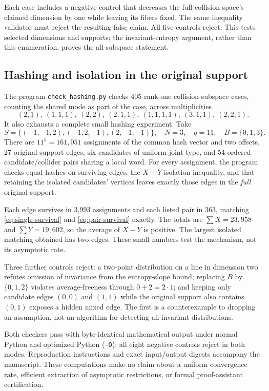 Each case includes a negative control that decreases the full collision
space's claimed dimension by one while leaving its fibers fixed. The
same inequality validator must reject the resulting false claim.
All five controls reject. This tests selected dimensions and supports;
the invariant-entropy argument, rather than this enumeration, proves
the all-subspace statement.

\subsection{Hashing and isolation in the original support}

The program \texttt{check\_hashing.py} checks 405 rank-one collision-subspace
cases, counting the shared mode as part of the case, across multiplicities
\[
 (2,1),\ (1,1,1),\ (2,2),\ (2,1,1),\ (1,1,1,1),\ (3,1,1),\ (2,2,1).
\]
It also exhausts a complete small hashing experiment. Take
\[
 S=\{(-1,-1,2),(-1,2,-1),(2,-1,-1)\},\quad
 N=3,\quad q=11,\quad B=\{0,1,3\}.
\]
There are $11^5=161{,}051$ assignments of the common hash vector and
two offsets, 27 original support edges, six candidates of uniform joint
type, and 54 ordered candidate/collider pairs sharing a local word.
For every assignment, the program checks equal hashes on surviving
edges, the $X-Y$ isolation inequality, and that retaining the isolated
candidates' vertices leaves exactly those edges in the \emph{full}
original support.

Each edge survives in 3,993 assignments and each listed pair in 363,
matching \eqref{eq:single-survival} and \eqref{eq:pair-survival} exactly.
The totals are $\sum X=23{,}958$ and $\sum Y=19{,}602$, so the
average of $X-Y$ is positive. The largest isolated matching obtained
has two edges. These small numbers test the mechanism, not its
asymptotic rate.

Three further controls reject: a two-point distribution on a line in
dimension two refutes omission of invariance from the entropy-slope
bound; replacing $B$ by $\{0,1,2\}$ violates average-freeness through
$0+2=2\cdot1$; and keeping only candidate edges $(0,0)$ and $(1,1)$
while the original support also contains $(0,1)$ exposes a hidden mixed
edge. The first is a counterexample to dropping an assumption, not an
algorithm for detecting all invariant distributions.

Both checkers pass with byte-identical mathematical output under normal
Python and optimized Python (\texttt{-O}); all eight negative controls
reject in both modes. Reproduction instructions and exact input/output
digests accompany the manuscript. These computations make no claim about
a uniform convergence rate, efficient extraction of asymptotic restrictions,
or formal proof-assistant certification.
